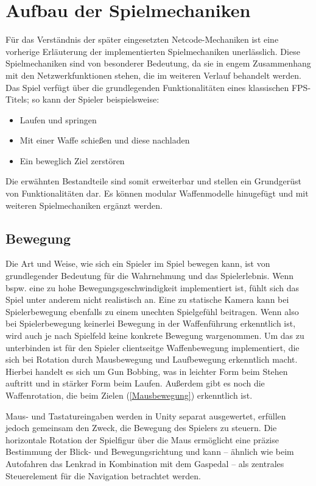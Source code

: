 \chapter{Aufbau der Spielmechaniken}
Für das Verständnis der später eingesetzten Netcode-Mechaniken ist eine vorherige Erläuterung der implementierten Spielmechaniken unerlässlich. Diese Spielmechaniken sind von besonderer Bedeutung, da sie in engem Zusammenhang mit den Netzwerkfunktionen stehen, die im weiteren Verlauf behandelt werden. Das Spiel verfügt über die grundlegenden Funktionalitäten eines klassischen FPS-Titels; so kann der Spieler beispielsweise:

\begin{itemize}
    \item Laufen und springen
    \item Mit einer Waffe schießen und diese nachladen 
    \item Ein beweglich Ziel zerstören
\end{itemize}

Die erwähnten Bestandteile sind somit erweiterbar und stellen ein Grundgerüst von Funktionalitäten dar. Es können modular Waffenmodelle hinugefügt und mit weiteren Spiel\-mechaniken ergänzt werden. 

\section{Bewegung}
Die Art und Weise, wie sich ein Spieler im Spiel bewegen kann, ist von grundlegender Bedeutung für die Wahrnehmung und das Spielerlebnis. Wenn bspw. eine zu hohe Bewegungsgeschwindigkeit implementiert ist, fühlt sich das Spiel unter anderem nicht realistisch an.
Eine zu statische Kamera kann bei Spielerbewegung ebenfalls zu einem unechten Spielgefühl beitragen. Wenn also bei Spielerbewegung keinerlei Bewegung in der Waffenführung erkenntlich ist, wird auch je nach Spielfeld keine konkrete Bewegung wargenommen.
Um das zu unterbinden ist für den Spieler clientseitge Waffenbewegung implementiert, die sich bei Rotation durch Mausbewegung und Laufbewegung erkenntlich macht. Hierbei handelt es sich um Gun Bobbing, was in leichter Form beim Stehen auftritt und in stärker Form beim Laufen. Außerdem gibt es noch die Waffenrotation, die beim Zielen (\ref{Mausbewegung}) erkenntlich ist.

Maus- und Tastatureingaben werden in Unity separat ausgewertet, erfüllen jedoch gemeinsam den Zweck, die Bewegung des Spielers zu steuern. Die horizontale Rotation der Spielfigur über die Maus ermöglicht eine präzise Bestimmung der Blick- und Bewegungsrichtung und kann – ähnlich wie beim Autofahren das Lenkrad in Kombination mit dem Gaspedal – als zentrales Steuerelement für die Navigation betrachtet werden.

